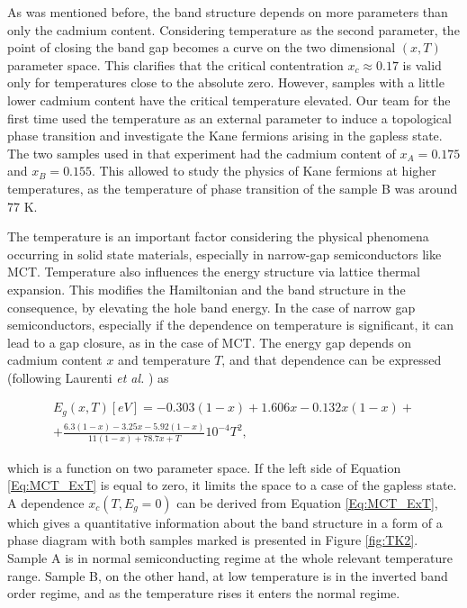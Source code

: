\documentclass[titlepage,a4paper]{book}
\begin{document}
As was mentioned before, the band structure depends on more parameters than only the cadmium content. Considering temperature as the second parameter, the point of closing the band gap becomes a curve on the two dimensional $(x, T)$ parameter space. This clarifies that the critical contentration $x_c \approx 0.17$ is valid only for temperatures close to the absolute zero. However, samples with a little lower cadmium content have the critical temperature elevated. Our team \cite{Teppe_MCT} for the first time used the temperature as an external parameter to induce a topological phase transition and investigate the Kane fermions arising in the gapless state. The two samples used in that experiment had the cadmium content of $x_A = 0.175$ and $x_B = 0.155$. This allowed to study the physics of Kane fermions at higher temperatures, as the temperature of phase transition of the sample B was around 77 K.  

The temperature is an important factor considering the physical phenomena occurring in solid state materials, especially in narrow-gap semiconductors like MCT. Temperature also influences the energy structure via lattice thermal expansion. This modifies the Hamiltonian and the band structure in the consequence, by elevating the hole band energy. In the case of narrow gap semiconductors, especially if the dependence on temperature is significant, it can lead to a gap closure, as in the case of MCT. The energy gap depends on cadmium content $x$ and temperature $T$, and that dependence can be expressed (following Laurenti \textit{et al.} \cite{Laurenti_MCT_bulk}) as

\begin{equation}
\begin{aligned}
\label{Eq:MCT_ExT}
E_g (x,T)[eV] = -0.303(1-x) + 1.606x - 0.132x(1-x) +\\ +\frac{6.3(1-x)-3.25x-5.92(1-x)}{11(1-x)+78.7x+T}10^{-4}T^2,
\end{aligned}
\end{equation}

which is a function on two parameter space. If the left side of Equation \ref{Eq:MCT_ExT} is equal to zero, it limits the space to a case of the gapless state. A dependence $x_c(T, E_g = 0)$ can be derived from Equation \ref{Eq:MCT_ExT}, which gives a quantitative information about the band structure in a form of a phase diagram with both samples marked is presented in Figure \ref{fig:TK2}. Sample A is in normal semiconducting regime at the whole relevant temperature range. Sample B, on the other hand, at low temperature is in the inverted band order regime, and as the temperature rises it enters the normal regime. 
\end{document}

